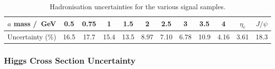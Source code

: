 \documentclass[NOTE, atlasdraft=true, texlive=2017, UKenglish]{\ATLASLATEXPATH atlasdoc}
\begin{document}

\begin{table}[!htbp]{\footnotesize\renewcommand{\arraystretch}{1.2}
  \begin{center}
    \footnotesize
    \begin{tabular}{|c|ccccccccc|cc|}
      \hline
      $a$ mass /~GeV & 0.5 & 0.75 & 1 & 1.5 & 2 & 2.5 & 3 & 3.5 & 4 & $\eta_c$ & $J/\psi$ \\
      \hline
      Uncertainty (\%) & 16.5 & 17.7 & 15.4 & 13.5 & 8.97 & 7.10 & 6.78 & 10.9 & 4.16 & 3.61 & 18.3 \\
      \hline
    \end{tabular}
    \caption{Hadronisation uncertainties for the various signal samples.}
    \label{tab:sighadunctable}
  \end{center}}
\end{table}


\subsubsection{Higgs Cross Section Uncertainty}
\label{sec:syshiggsxsec}
\end{document}
